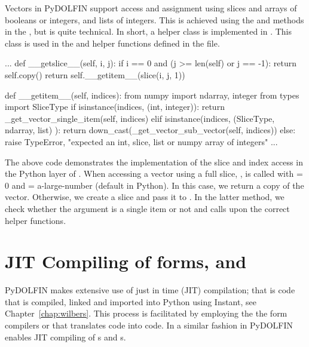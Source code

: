 Vectors in PyDOLFIN support access and assignment using slices and \numpy
arrays of booleans or integers, and lists of integers. This is achieved
using the  and  methods in the , 
but is quite technical. In short,  a helper class  
is implemented in . This class is used   
in the  and  helper functions defined
in the  file.
\begin{python}
   ...
    def __getslice__(self, i, j):
        if i == 0 and (j >= len(self) or j == -1):
            return self.copy()
        return self.__getitem__(slice(i, j, 1))

    def __getitem__(self, indices):
        from numpy import ndarray, integer
        from types import SliceType
        if isinstance(indices, (int, integer)):
            return _get_vector_single_item(self, indices)
        elif isinstance(indices, (SliceType, ndarray, list) ):
            return down_cast(_get_vector_sub_vector(self, indices))
        else:
            raise TypeError, "expected an int, slice, list or numpy array of integers"
  ...
\end{python}
The above code demonstrates the implementation of the slice and index
access in the Python layer of . When accessing a vector
using a full slice, ,  is called with
 = 0 and  = a-large-number (default in Python).  In this
case, we return a copy of the vector. Otherwise, we create a slice and pass
it to . In the latter method, we check whether the
 argument is a single item or not and calls upon the 
correct helper functions. 

\section{JIT Compiling of \ufl forms,  and }
PyDOLFIN makes extensive use of just in time (JIT) compilation; that is code that is
compiled, linked and imported into Python using Instant, see
Chapter~\ref{chap:wilbers}. This process is facilitated by employing the
the form compilers \ffc or \sfc that translates \ufl code into \ufc code. 
In a similar fashion in PyDOLFIN enables JIT compiling of s
and s.  


